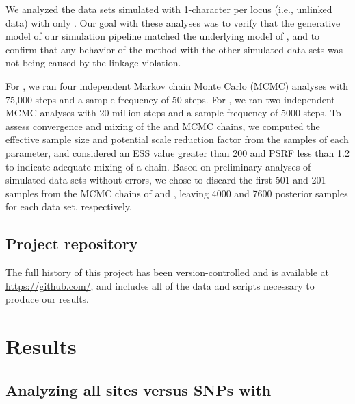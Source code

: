 We analyzed the data sets simulated with 1-character per locus (i.e., unlinked
data) with only \ecoevolity.
Our goal with these analyses was to
verify that the generative model of our simulation pipeline matched the
underlying model of \ecoevolity, and to confirm that any behavior of the method
with the other simulated data sets was not being caused by the linkage
violation.

For \ecoevolity, we ran four independent Markov chain Monte Carlo (MCMC)
analyses with 75,000 steps and a sample frequency of 50 steps.
For \beast, we ran two independent MCMC analyses with 20 million steps and a
sample frequency of 5000 steps. 
To assess convergence and mixing of the \ecoevolity and \beast MCMC chains, we
computed the effective sample size
\citep[ESS;][]{Gong2014}
and potential scale reduction factor
\citep[PSRF; the square root of Equation 1.1 in][]{Brooks1998}
from the samples of each parameter, and considered an ESS value greater
than 200 and PSRF less than 1.2 \citep{gelman1998} to indicate adequate mixing
of a chain. 
Based on preliminary analyses of simulated data sets without errors,
we chose to discard the first 501 and 201 samples from
the MCMC chains of \ecoevolity and \beast, leaving 4000 and
7600 posterior samples for each data set, respectively.


\subsection{Project repository}
The full history of this project has been version-controlled and is available
at
\url{https://github.com/},
and includes
all of the data and scripts necessary to produce our results.


\section{Results}

\subsection{Analyzing all sites versus SNPs with \ecoevolity}

